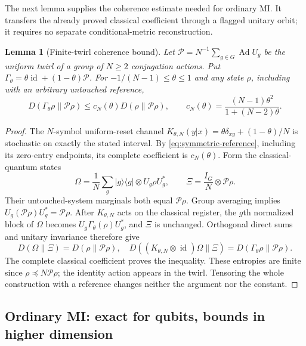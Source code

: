\documentclass[11pt]{article}
\numberwithin{equation}{section}
\newtheorem{lemma}[theorem]{Lemma}
\theoremstyle{definition}
\theoremstyle{remark}
\DeclareMathOperator{\id}{id}
\DeclareMathOperator{\Ad}{Ad}
\newcommand{\ket}[1]{\lvert #1\rangle}
\newcommand{\bra}[1]{\langle #1\rvert}
\begin{document}
The next lemma supplies the coherence estimate needed for ordinary MI.
It transfers the already proved classical coefficient through a flagged
unitary orbit; it requires no separate conditional-metric reconstruction.

\begin{lemma}[Finite-twirl coherence bound]
\label{lem:twirl-coherence}
Let $\mathcal P=N^{-1}\sum_{g\in G}\Ad U_g$ be the uniform twirl of
a group of $N\geq2$ conjugation actions. Put
$\Gamma_\theta=\theta\id+(1-\theta)\mathcal P$.
For $-1/(N-1)\leq\theta\leq1$ and any state $\rho$, including with
an arbitrary untouched reference,
\begin{equation}
 D(\Gamma_\theta\rho\|\mathcal P\rho)
 \leq c_N(\theta)D(\rho\|\mathcal P\rho),\qquad
 c_N(\theta)=\frac{(N-1)\theta^2}{1+(N-2)\theta}.
 \label{eq:twirl-coherence}
\end{equation}
\end{lemma}
\begin{proof}
The $N$-symbol uniform-reset channel
$K_{\theta,N}(y|x)=\theta\delta_{xy}+(1-\theta)/N$
is stochastic on exactly the stated interval.
By \eqref{eq:symmetric-reference}, including its zero-entry endpoints,
its complete coefficient is $c_N(\theta)$.
Form the classical-quantum states
\[
 \Omega=\frac1N\sum_g\ket g\bra g\otimes U_g\rho U_g^*,
 \qquad \Xi=\frac{I_G}{N}\otimes\mathcal P\rho .
\]
Their untouched-system marginals both equal $\mathcal P\rho$.
Group averaging implies $U_g(\mathcal P\rho)U_g^*=\mathcal P\rho$.
After $K_{\theta,N}$ acts on the classical register, the $g$th
normalized block of $\Omega$ becomes
$U_g\Gamma_\theta(\rho)U_g^*$, and $\Xi$ is unchanged.
Orthogonal direct sums and unitary invariance therefore give
\[
 D(\Omega\|\Xi)=D(\rho\|\mathcal P\rho),\quad
 D((K_{\theta,N}\otimes\id)\Omega\|\Xi)
       =D(\Gamma_\theta\rho\|\mathcal P\rho).
 \]
The complete classical coefficient proves the inequality.
These entropies are finite since
$\rho\preceq N\mathcal P\rho$; the identity action appears in the
twirl. Tensoring the whole construction with a reference changes
neither the argument nor the constant.
\end{proof}

\subsection{Ordinary MI: exact for qubits, bounds in higher dimension}
\end{document}
